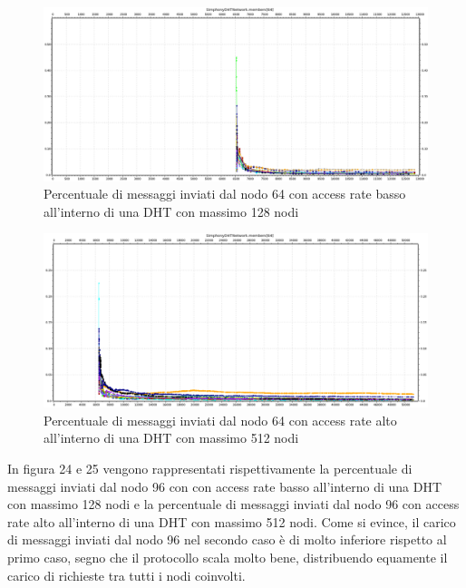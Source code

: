 \documentclass[	
	DIV=calc,
	paper=a4,
	fontsize=11pt,
	onecolumn
]{scrartcl} %
\begin{document}
	\begin{figure}[H]
		\centering
		\includegraphics[scale=0.35]	{SymphonyDHT/plots/PercentageOfMessagesSent/128_Nodes_SlowAccess/SymphonyDHT_128Nodes_SlowAccess_Node64.png}
		\caption{Percentuale di messaggi inviati dal nodo 64 con access rate basso all'interno di una DHT con massimo 128 nodi}
		\label{Figura 22}
	\end{figure}
	\begin{figure}[H]
		\centering
		\includegraphics[scale=0.35]	{SymphonyDHT/plots/PercentageOfMessagesSent/512_Nodes_FastAccess/SymphonyDHT_512Nodes_FastAccess_Node64.png}
		\caption{Percentuale di messaggi inviati dal nodo 64 con access rate alto all'interno di una DHT con massimo 512 nodi}
		\label{Figura 23}
	\end{figure}	
	
	In figura 24 e 25 vengono rappresentati rispettivamente la percentuale di messaggi inviati dal nodo 96 con con access rate basso all'interno di una DHT con massimo 128 nodi e la percentuale di messaggi inviati dal nodo 96 con access rate alto all'interno di una DHT con massimo 512 nodi. Come si evince, il carico di messaggi inviati dal nodo 96 nel secondo caso è di molto inferiore rispetto al primo caso, segno che il protocollo scala molto bene, distribuendo equamente il carico di richieste tra tutti i nodi coinvolti.
	
\end{document}
